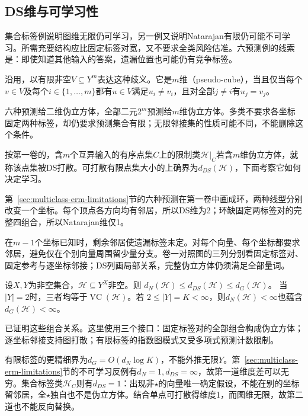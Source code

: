 \subsection{DS维与可学习性}
\label{sec:ds-dimension}

集合标签例说明图维无限仍可学习，另一例又说明Natarajan有限仍可能不可学习。所需充要结构应比固定标签对宽，又不要求全类风险估准。六预测例的线索是：即使知道其他输入的答案，遗漏位置也可能仍有竞争标签。

沿用，以有限非空$V\subseteq Y^m$表达这种歧义。它是$m$维（pseudo-cube），当且仅当每个$v\in V$及每个$i\in\{1,\ldots,m\}$都有$u\in V$满足$u_i\neq v_i$，且对全部$j\neq i$有$u_j=v_j$。

六种预测给二维伪立方体，全部二元$2^m$预测给$m$维伪立方体。多类不要求各坐标固定两种标签，却仍要求预测集合有限；无限邻接集的性质可能不同，不能删除这个条件。

按第一卷的，含$m$个互异输入的有序点集$C$上的限制类$\mathcal H|_C$若含$m$维伪立方体，就称该点集被DS打散。可打散有限点集大小的上确界为$d_{DS}(\mathcal H)$，下面考察它如何决定学习。

第~\ref{sec:multiclass-erm-limitations}节的六种预测在第一卷中画成环，两种线型分别改变一个坐标。每个顶点各方向均有邻居，所以DS维为2；环缺固定两标签对的完整四组合，所以Natarajan维仅1。

在$m-1$个坐标已知时，剩余邻居使遗漏标签未定。对每个向量、每个坐标都要求邻居，避免仅在个别向量周围留少量分支。卷一对照图的三列分别看固定标签对、固定参考与逐坐标邻接；DS列画局部关系，完整伪立方体仍须满足全部量词。

\begin{theorem}[多分类维度的比较]
\label{thm:learning-multiclass-dimension-comparison}
设$X,Y$为非空集合，$\mathcal H\subseteq Y^X$非空。则
$d_N(\mathcal H)\leq d_{DS}(\mathcal H)\leq d_G(\mathcal H)$。
当$|Y|=2$时，三者均等于$\operatorname{VC}(\mathcal H)$。若
$2\leq|Y|=K<\infty$，则$d_N(\mathcal H)<\infty$也蕴含
$d_G(\mathcal H)<\infty$。
\end{theorem}

已证明这些组合关系。这里使用三个接口：固定标签对的全部组合构成伪立方体；逐坐标邻接支持图打散；有限标签的指数图模式又受多项式预测计数限制。

有限标签的更精细界为$d_G=O(d_N\log K)$，不能外推无限$Y$。第~\ref{sec:multiclass-erm-limitations}节的不可学习反例有$d_N=1,d_{DS}=\infty$，故第一道维度差可以无穷。集合标签类$\mathcal H_C$则有$d_{DS}=1$：出现非$\star$的向量唯一确定假设，不能在别的坐标留邻居，全$\star$独自也不是伪立方体。结合单点可打散得维度1，而图维无限，故第二道也不能反向替换。

